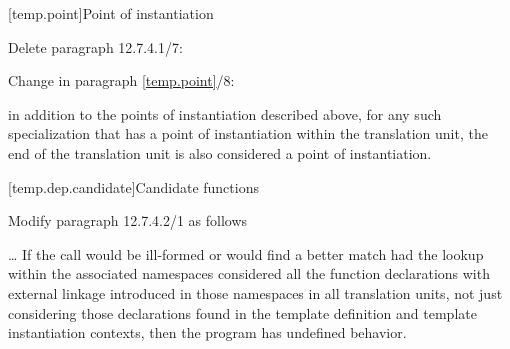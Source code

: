 [temp.point]{Point of instantiation}

\noindent
Delete paragraph 12.7.4.1/7:
\begin{std.txt}
\pnum[7]
\end{std.txt}

\noindent
Change in paragraph \ref{temp.point}/8:
\begin{std.txt}
\pnum[8]
in addition to the points of instantiation described above, for any such
specialization that has a point of instantiation within the
translation unit,
the end of the translation unit is also
considered a point of instantiation.
\end{std.txt}

[temp.dep.candidate]{Candidate functions}

\noindent
Modify paragraph 12.7.4.2/1 as follows
\begin{std.txt}
\pnum[1]
\ldots
If the call would be ill-formed or would find a better match had the 
lookup within the associated namespaces considered all the function 
declarations with external   
linkage introduced in those namespaces in all
translation units, not just considering those declarations found in the 
template definition and template instantiation contexts, then the program 
has undefined behavior.
\end{std.txt}



